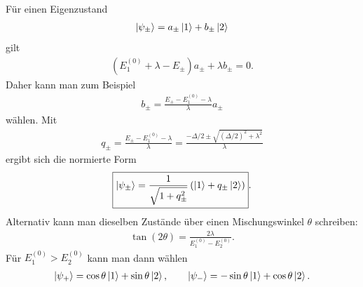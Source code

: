 \documentclass[11pt,a4paper]{scrartcl}
\begin{document}
\begin{enumerate}[label=(\alph*)]
\begin{calculationbox}
            \begin{calculationbox}[title=Exakte Eigenzustände]
                Für einen Eigenzustand
                \begin{align*}
                    \ket{\psi_\pm}
                    =
                    a_\pm\ket{1}+b_\pm\ket{2}
                \end{align*}
                gilt
                \begin{align*}
                    (E_1^{(0)}+\lambda-E_\pm)a_\pm
                    +
                    \lambda b_\pm
                    =0.
                \end{align*}
                Daher kann man zum Beispiel
                \begin{align*}
                    b_\pm
                    =
                    \frac{E_\pm-E_1^{(0)}-\lambda}{\lambda}a_\pm
                \end{align*}
                wählen. Mit
                \begin{align*}
                    q_\pm
                    =
                    \frac{E_\pm-E_1^{(0)}-\lambda}{\lambda}
                    =
                    \frac{-\Delta/2 \pm \sqrt{(\Delta/2)^2+\lambda^2}}{\lambda}
                \end{align*}
                ergibt sich die normierte Form
                \begin{align*}
                    \boxed{
                    \ket{\psi_\pm}
                    =
                    \frac{1}{\sqrt{1+q_\pm^2}}
                    \left(\ket{1}+q_\pm\ket{2}\right)}.
                \end{align*}
                Alternativ kann man dieselben Zustände über einen Mischungswinkel $\theta$ schreiben:
                \begin{align*}
                    \tan(2\theta)
                    =
                    \frac{2\lambda}{E_1^{(0)}-E_2^{(0)}}.
                \end{align*}
                Für $E_1^{(0)}>E_2^{(0)}$ kann man dann wählen
                \begin{align*}
                    \ket{\psi_+}=\cos\theta\ket{1}+\sin\theta\ket{2},
                    \qquad
                    \ket{\psi_-}=-\sin\theta\ket{1}+\cos\theta\ket{2}.
                \end{align*}
            \end{calculationbox}
        \end{calculationbox}


\end{enumerate}
\end{document}
